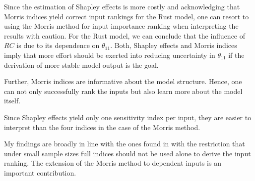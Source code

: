 Since the estimation of Shapley effects is more costly and acknowledging that Morris
indices yield correct input rankings for the Rust model, one can resort to using the Morris
method for input importance ranking when interpreting the results with caution. For the Rust model, we can conclude that the influence of $RC$ is due to its dependence on $\theta_{11}$. Both, Shapley effects and Morris indices imply that more effort should be exerted into reducing uncertainty in $\theta_{11}$ if the derivation of more stable model output is the goal.

Further, Morris indices are informative about the model structure. Hence, one can not only successfully rank the inputs but also learn more about the model itself.

Since Shapley effects yield only one sensitivity index per input, they are easier to interpret than the four indices in the case of the Morris method.

My findings are broadly in line with the ones found in \citet{GM17} with the restriction that under small sample sizes full indices should not be used alone to derive the input ranking. The extension of the Morris method to dependent inputs is an important contribution.
